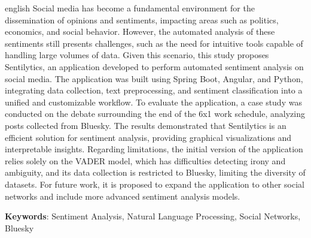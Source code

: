 \documentclass[
	12pt,				%
	oneside,			%
	a4paper,			%
	english,			%
	french,				%
	spanish,			%
	brazil				%
	]{abntex2}
\newcommand{\listasdousuario}{}
\begin{document}
\begin{resumo}[Abstract]
 \begin{otherlanguage*}{english}
   Social media has become a fundamental environment for the dissemination
   of opinions and sentiments, impacting areas such as politics, economics,
   and social behavior. However, the automated analysis of these sentiments
   still presents challenges, such as the need for intuitive tools capable
   of handling large volumes of data. Given this scenario, this study
   proposes Sentilytics, an application developed to perform automated
   sentiment analysis on social media. The application was built using
   Spring Boot, Angular, and Python, integrating data collection, text
   preprocessing, and sentiment classification into a unified and
   customizable workflow. To evaluate the application, a case study was
   conducted on the debate surrounding the end of the 6x1 work schedule,
   analyzing posts collected from Bluesky. The results demonstrated that
   Sentilytics is an efficient solution for sentiment analysis, providing
   graphical visualizations and interpretable insights. Regarding
   limitations, the initial version of the application relies solely on the
   VADER model, which has difficulties detecting irony and ambiguity, and
   its data collection is restricted to Bluesky, limiting the diversity of
   datasets. For future work, it is proposed to expand the application to
   other social networks and include more advanced sentiment analysis
   models.

   \vspace{\onelineskip}
 
   \noindent 
   \textbf{Keywords}: Sentiment Analysis, Natural Language Processing, Social Networks,
Bluesky
 \end{otherlanguage*}
\end{resumo}



\listoffigures*
\cleardoublepage



\listasdousuario
\listoftables*
\cleardoublepage
\end{document}
